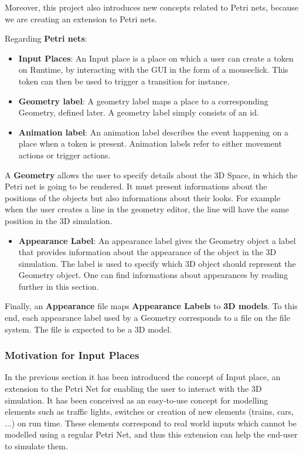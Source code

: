Moreover, this project also introduces new concepts related to Petri nets, because we are creating an extension to Petri nets.

Regarding \textbf{Petri nets}:
\begin{itemize}
  \item \textbf{Input Places}: An Input place is a place on which a user can create a token on Runtime, by interacting with the GUI in the form of a mouseclick. This token can then be used to trigger a transition for instance.
  \item \textbf{Geometry label}: A geometry label maps a place to a corresponding Geometry, defined later.
  A geometry label simply consists of an id.

  \item \textbf{Animation label}: An animation label describes the event happening on a place when a token is present.
Animation labels refer to either movement actions or trigger actions.\end{itemize}

A \textbf{Geometry} allows the user to specify details about the 3D Space, in which the Petri net is going to be rendered. It must present informations about the positions of the objects but also informations about their looks. For example when the user creates a line in the geometry editor, the line will have the same position in the 3D simulation.

\begin{itemize}
  \item \textbf{Appearance Label}: An appearance label gives the Geometry object a label that provides information about the appearance of the object in the 3D simulation. The label is used to specify which 3D object should represent the Geometry object. One can find informations about appearances by reading further in this section.
\end{itemize}

Finally, an \textbf{Appearance} file maps \textbf{Appearance Labels} to \textbf{3D models}.
To this end, each appearance label used by a Geometry corresponds to a file on the file system. The file is expected to be a 3D model.

\subsubsection{Motivation for Input Places}

In the previous section it has been introduced the concept of Input place, an extension to the Petri Net for enabling the user to interact with the 3D simulation. It has been conceived as an easy-to-use concept for modelling elements such as traffic lights, switches or creation of new elements (trains, cars, ...) on run time. These elements correspond to real world inputs which cannot be modelled using a regular Petri Net, and thus this extension can help the end-user to simulate them.

\newpage
